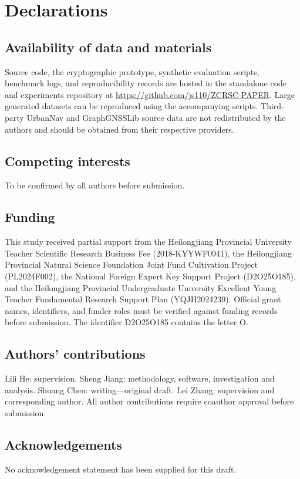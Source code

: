 \documentclass[referee,lineno,pdflatex,sn-basic,Numbered]{sn-jnl}
\begin{document}
\section*{Declarations}
\subsection*{Availability of data and materials}
Source code, the cryptographic prototype, synthetic evaluation scripts, benchmark logs, and reproducibility records are hosted in the standalone code and experiments repository at \url{https://github.com/js110/ZCRSC-PAPER}. Large generated datasets can be reproduced using the accompanying scripts. Third-party UrbanNav and GraphGNSSLib source data are not redistributed by the authors and should be obtained from their respective providers.
\subsection*{Competing interests}
To be confirmed by all authors before submission.
\subsection*{Funding}
This study received partial support from the Heilongjiang Provincial University Teacher Scientific Research Business Fee (2018-KYYWF0941), the Heilongjiang Provincial Natural Science Foundation Joint Fund Cultivation Project (PL2024F002), the National Foreign Expert Key Support Project (D2O25O185), and the Heilongjiang Provincial Undergraduate University Excellent Young Teacher Fundamental Research Support Plan (YQJH2024239). Official grant names, identifiers, and funder roles must be verified against funding records before submission. The identifier D2O25O185 contains the letter O.
\subsection*{Authors' contributions}
Lili He: supervision. Sheng Jiang: methodology, software, investigation and analysis. Shuang Chen: writing---original draft. Lei Zhang: supervision and corresponding author. All author contributions require coauthor approval before submission.
\subsection*{Acknowledgements}
No acknowledgement statement has been supplied for this draft.


\end{document}
